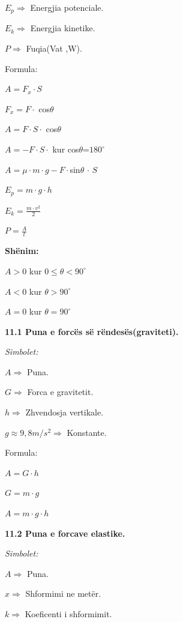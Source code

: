 \documentclass[twocolumn]{article}
\begin{document}
	$E_p \Rightarrow $ Energjia potenciale.
	
	$E_k \Rightarrow$ Energjia kinetike.
	
	$P \Rightarrow $ Fuqia(Vat ,W).
	\begin{center}
		Formula:
	\end{center}
	
	$A=F_x \cdot S$
	
	$F_x=F \cdot $ cos$\theta$
	
	$A=F \cdot S \cdot$ cos$\theta$
	
	$A=-F \cdot S \cdot $ kur cos$\theta$=$180^\circ$
	
	$A=\mu\cdot m\cdot g-F \cdot $sin$\theta$ $\cdot$ $S$
	
	$E_p=m \cdot g \cdot h$
	
	$E_k=\frac{m \cdot v^2}{2}$
	
	$P=\frac{A}{t}$
	
	
	\textbf{Shënim:}
	
	$A>0$ kur $0 \leq \theta < 90^\circ$
	
	$A<0$ kur $ \theta > 90^\circ$
	
	$A=0$ kur $ \theta=90^\circ$
	
	\textbf{11.1 Puna e forcës së rëndesës(graviteti).}
	
	\begin{center}
		\textit{Simbolet:}
	\end{center}
	
	$A \Rightarrow $ Puna.
	
	$G \Rightarrow$ Forca e gravitetit.
	
	$h \Rightarrow$ Zhvendosja vertikale.
	
	$g \approx 9,8 m/s^2 \Rightarrow$ Konstante.
	\begin{center}
		Formula:
	\end{center}
	
	$A=G \cdot h$
	
	$G=m \cdot g$
	
	$A=m \cdot g \cdot h$
	
	\textbf{11.2 Puna e forcave elastike.}
	
	\begin{center}
		\textit{Simbolet:}
	\end{center}
	
	$A \Rightarrow $ Puna.
	
	$x \Rightarrow $ Shformimi ne metër.
	
	$k \Rightarrow $ Koeficenti i shformimit.
	
\end{document}
